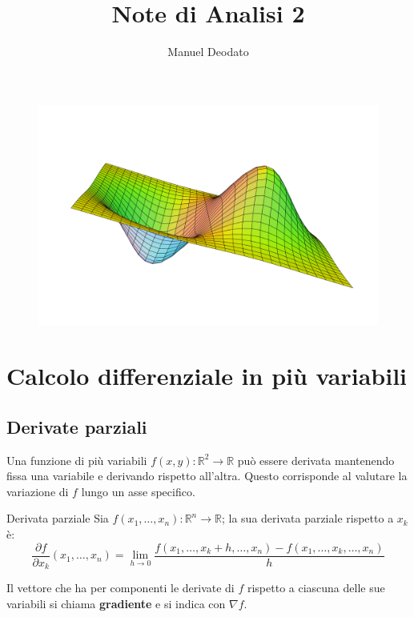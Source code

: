 \documentclass[10pt, a4paper]{scrartcl}
\title{Note di Analisi 2}
\author{Manuel Deodato}
\date{}
\theoremstyle{definition}
\numberwithin{esempio}{section}
\theoremstyle{definition}
\numberwithin{obs}{section}
\numberwithin{nota}{section}
\renewcommand{\maketitle}{
\begin{center}
{\sffamily
{\fontsize{20}{20}\selectfont\MakeUppercase\thetitle}}

\vspace{0.2in}

{\large\scshape\sffamily\theauthor}
\end{center}
}
\numberwithin{equation}{subsection}
\begin{document}
\maketitle
\vspace{9cm}
\begin{figure}[h!]
	\centering
	\includegraphics[width=1\columnwidth]{front.png}
\end{figure}
\newpage
\tableofcontents 
\newpage
\section{Calcolo differenziale in pi\`u variabili}
\subsection{Derivate parziali}

Una funzione di pi\`u variabili $f(x,y):\mathbb{R}^2 \to \mathbb{R}$ pu\`o essere derivata mantenendo fissa una variabile e derivando rispetto all'altra. Questo corrisponde al valutare la variazione di $f$ lungo un asse specifico.
\begin{definizione}
	{Derivata parziale}{}
	Sia $f(x_1,\ldots,x_n) :\mathbb{R}^n \to \mathbb{R}$; la sua derivata parziale rispetto a $x_k$ \`e:
	\begin{equation}
		\frac{\partial f}{\partial x_k}(x_1,\ldots,x_n) = \lim_{h \to 0} \frac{f(x_1,\ldots,x_k + h, \ldots, x_n)-f(x_1,\ldots,x_k,\ldots,x_n)}{h}
	\end{equation}
\end{definizione}
\noindent Il vettore che ha per componenti le derivate di $f$ rispetto a ciascuna delle sue variabili si chiama \textbf{gradiente} e si indica con $\nabla f$.
\end{document}
